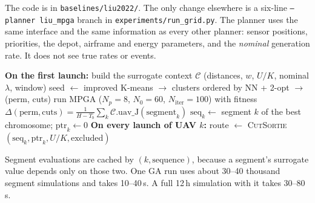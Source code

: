 \documentclass[10pt,a4paper]{article}
\begin{document}
The code is in \texttt{baselines/liu2022/}. The only change elsewhere is a six-line
\texttt{--planner liu\_mpga} branch in \texttt{experiments/run\_grid.py}. The planner uses the same
interface and the same information as every other planner: sensor positions, priorities, the depot,
airframe and energy parameters, and the \emph{nominal} generation rate. It does not see true rates or
events.

\begin{algorithm}[H]\small
\caption{Adapted Liu MPGA planner inside the simulator}
\begin{algorithmic}[1]
\State \textbf{On the first launch:} build the surrogate context $\mathcal C$ (distances, $w$, $U/K$, nominal $\lambda$, window)
\State seed $\gets$ improved K-means $\to$ clusters ordered by NN + 2-opt $\to$ (perm, cuts)
\State run MPGA ($N_p{=}8$, $N_0{=}60$, $N_{\mathrm{iter}}{=}100$) with fitness $\Delta(\text{perm},\text{cuts})=\frac{1}{H-T_b}\sum_k \mathcal C.\mathrm{uav\_J}(\text{segment}_k)$
\State $\text{seq}_k \gets$ segment $k$ of the best chromosome; $\text{ptr}_k\gets 0$
\State \textbf{On every launch of UAV $k$:} route $\gets$ \textsc{CutSortie}$(\text{seq}_k,\text{ptr}_k, U/K, \text{excluded})$
\State {}
\end{algorithmic}
\end{algorithm}

\noindent Segment evaluations are cached by $(k,\text{sequence})$, because a segment's surrogate value depends
only on those two. One GA run uses about 30--40 thousand segment simulations and takes 10--40\,s. A full
12\,h simulation with it takes 30--80\,s.

\end{document}
